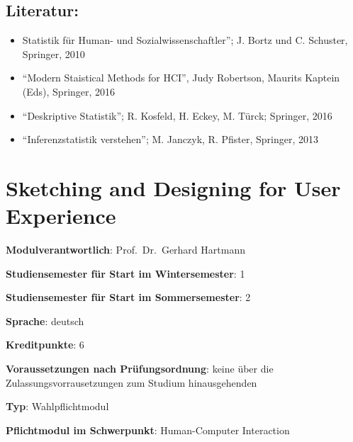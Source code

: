 \section*{Literatur:}\label{literatur-6}

\begin{itemize}
\tightlist
\item
  Statistik für Human- und Sozialwissenschaftler''; J. Bortz und C.
  Schuster, Springer, 2010
\item
  ``Modern Staistical Methods for HCI'', Judy Robertson, Maurits Kaptein
  (Eds), Springer, 2016
\item
  ``Deskriptive Statistik''; R. Kosfeld, H. Eckey, M. Türck; Springer,
  2016
\item
  ``Inferenzstatistik verstehen''; M. Janczyk, R. Pfister, Springer,
  2013
\end{itemize}

\chapter{Sketching and Designing for User
Experience}\label{sketching-and-designing-for-user-experience}

\begin{modulHead}
\textbf{Modulverantwortlich}: Prof.~Dr.~Gerhard
Hartmann
\end{modulHead}
\begin{modulHead}
\textbf{Studiensemester für
Start im Wintersemester}:
1
\end{modulHead}
\begin{modulHead}
\textbf{Studiensemester für Start
im Sommersemester}:
2
\end{modulHead}
\begin{modulHead}
\textbf{Sprache}:
deutsch
\end{modulHead}
\begin{modulHead}
\textbf{Kreditpunkte}:
6
\end{modulHead}
\begin{modulHead}
\textbf{Voraussetzungen nach
Prüfungsordnung}: keine über die Zulassungsvorrausetzungen zum Studium
hinausgehenden
\end{modulHead}
\begin{modulHead}
\textbf{Typ}:
Wahlpflichtmodul
\end{modulHead}
\begin{modulHead}
\textbf{Pflichtmodul
im Schwerpunkt}: Human-Computer Interaction
\end{modulHead}


